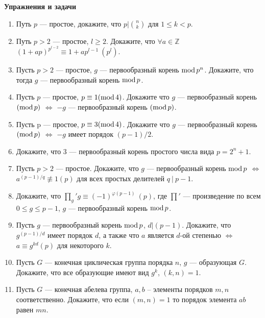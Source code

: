 \noindent\textbf{Упражнения и задачи}

\begin{enumerate}[topsep=0pt]
    \item Путь $p$ --- простое, докажите, что $p|\binom{n}{k}$ для $1 \leqslant k < p$.
    \item Путь $p>2$ --- простое, $l\geqslant 2$. Докажите, что $\forall a \in \mathbb{Z}$ $(1+ap)^{p^{l-2}} \equiv 1+ap^{l-1}\ (p^l)$.
    \item Пусть $p>2$ --- простое, $g$ --- первообразный корень $\operatorname{mod} p^n$. Докажите, что тогда $g$ --- первообразный корень $\operatorname{mod} p$. %
    \item Пусть $p$ --- простое, $p \equiv 1 (\operatorname{mod} 4)$. Докажите что $g$ --- первообразный корень $(\operatorname{mod} p)$ $\Leftrightarrow$ $-g$ --- первообразный корень $(\operatorname{mod} p)$. %
    \item Пусть p --- простое, $p \equiv 3 (\operatorname{mod} 4)$. Докажите что $g$ --- первообразный корень $(\operatorname{mod} p)$ $\Leftrightarrow$ $-g$ имеет порядок $(p-1)/2$. %
    \item Докажите, что $3$ --- первообразный корень простого числа вида $p=2^n+1$. %
    \item Пусть $p>2$ --- простое. Докажите, что $g$ --- первообразный корень $\operatorname{mod} p$ $\Leftrightarrow$\\ $a^{(p-1)/q}\not\equiv 1 (p)$ для всех простых делителей $q\ |\ p-1$. %
    \item Докажите, что ${\prod\limits_{g}}'g \equiv (-1)^{\varphi(p-1)}\ (p)$, где $\prod'$ --- произведение по всем $0\leqslant g \leqslant p-1$, $g$ --- первообразный корень $\operatorname{mod} p$. %
    \item Пусть $g$ --- первообразный корень $\operatorname{mod} p$, $d|(p-1)$. Докажите, что $g^{(p-1)/d}$ имеет порядок $d$, а также что $a$ является $d$-ой степенью $\Leftrightarrow$ $a \equiv g^{kd} (p)$ для некоторого $k$. %
    \item Пусть $G$ --- конечная циклическая группа порядка $n$, $g$ --- образующая $G$. Докажите, что все образующие имеют вид $g^k$, $(k,n)=1$. %
    \item Пусть $G$ --- конечная абелева группа, $a,b$ – элементы порядков $m,n$ соответственно. Докажите, что если $(m,n)=1$ то порядок элемента $ab$ равен $mn$. %

\end{enumerate}

